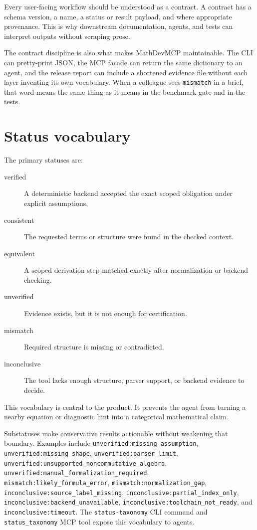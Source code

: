 \documentclass[12pt,a4paper,openany]{book}
\begin{document}
Every user-facing workflow should be understood as a contract. A contract has a
schema version, a name, a status or result payload, and where appropriate
provenance. This is why downstream documentation, agents, and tests can
interpret outputs without scraping prose.

The contract discipline is also what makes MathDevMCP maintainable. The CLI can
pretty-print JSON, the MCP facade can return the same dictionary to an agent,
and the release report can include a shortened evidence file without each layer
inventing its own vocabulary. When a colleague sees \texttt{mismatch} in a
brief, that word means the same thing as it means in the benchmark gate and in
the tests.

\section{Status vocabulary}

The primary statuses are:

\begin{description}
  \item[verified] A deterministic backend accepted the exact scoped obligation
    under explicit assumptions.
  \item[consistent] The requested terms or structure were found in the checked
    context.
  \item[equivalent] A scoped derivation step matched exactly after normalization
    or backend checking.
  \item[unverified] Evidence exists, but it is not enough for certification.
  \item[mismatch] Required structure is missing or contradicted.
  \item[inconclusive] The tool lacks enough structure, parser support, or
    backend evidence to decide.
\end{description}

This vocabulary is central to the product. It prevents the agent from turning a
nearby equation or diagnostic hint into a categorical mathematical claim.

Substatuses make conservative results actionable without weakening that
boundary. Examples include
\texttt{unverified:missing\_assumption},
\texttt{unverified:missing\_shape},
\texttt{unverified:parser\_limit},
\texttt{unverified:unsupported\_noncommutative\_algebra},
\texttt{unverified:manual\_formalization\_required},
\texttt{mismatch:likely\_formula\_error},
\texttt{mismatch:normalization\_gap},
\texttt{inconclusive:source\_label\_missing},
\texttt{inconclusive:partial\_index\_only},
\texttt{inconclusive:backend\_unavailable},
\texttt{inconclusive:toolchain\_not\_ready}, and
\texttt{inconclusive:timeout}. The \texttt{status-taxonomy} CLI command and
\texttt{status\_taxonomy} MCP tool expose this vocabulary to agents.
\end{document}

